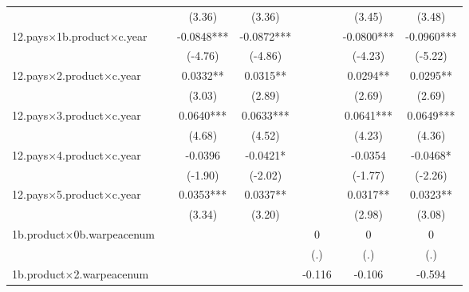 {\begin{tabular}{l*{6}{c}}
                    &                     &      (3.36)         &      (3.36)         &                     &      (3.45)         &      (3.48)         \\
[1em]
12.pays$\times$1b.product$\times$c.year&                     &     -0.0848***&     -0.0872***&                     &     -0.0800***&     -0.0960***\\
                    &                     &     (-4.76)         &     (-4.86)         &                     &     (-4.23)         &     (-5.22)         \\
[1em]
12.pays$\times$2.product$\times$c.year&                     &      0.0332** &      0.0315** &                     &      0.0294** &      0.0295** \\
                    &                     &      (3.03)         &      (2.89)         &                     &      (2.69)         &      (2.69)         \\
[1em]
12.pays$\times$3.product$\times$c.year&                     &      0.0640***&      0.0633***&                     &      0.0641***&      0.0649***\\
                    &                     &      (4.68)         &      (4.52)         &                     &      (4.23)         &      (4.36)         \\
[1em]
12.pays$\times$4.product$\times$c.year&                     &     -0.0396         &     -0.0421*  &                     &     -0.0354         &     -0.0468*  \\
                    &                     &     (-1.90)         &     (-2.02)         &                     &     (-1.77)         &     (-2.26)         \\
[1em]
12.pays$\times$5.product$\times$c.year&                     &      0.0353***&      0.0337** &                     &      0.0317** &      0.0323** \\
                    &                     &      (3.34)         &      (3.20)         &                     &      (2.98)         &      (3.08)         \\
[1em]
1b.product$\times$0b.warpeacenum&                     &                     &                     &           0         &           0         &           0         \\
                    &                     &                     &                     &         (.)         &         (.)         &         (.)         \\
[1em]
1b.product$\times$2.warpeacenum&                     &                     &                     &      -0.116         &      -0.106         &      -0.594         \\

\end{tabular}}
